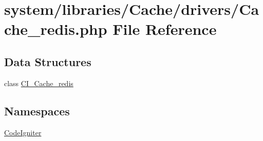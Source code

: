 \hypertarget{_cache__redis_8php}{}\section{system/libraries/\+Cache/drivers/\+Cache\+\_\+redis.php File Reference}
\label{_cache__redis_8php}
\subsection*{Data Structures}
\begin{DoxyCompactItemize}
\item 
class \mbox{\hyperlink{class_c_i___cache__redis}{C\+I\+\_\+\+Cache\+\_\+redis}}
\end{DoxyCompactItemize}
\subsection*{Namespaces}
\begin{DoxyCompactItemize}
\item 
 \mbox{\hyperlink{namespace_code_igniter}{Code\+Igniter}}
\end{DoxyCompactItemize}
